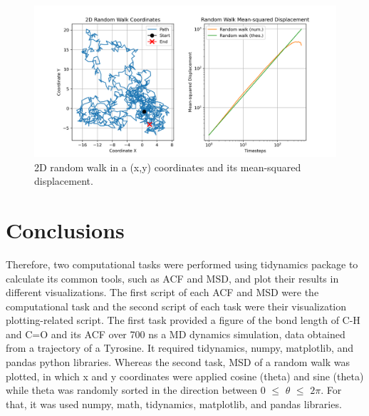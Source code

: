 \documentclass{article}
\begin{document}
\begin{figure}[H]
\centering
\includegraphics[width=\linewidth]{msd_plot.png}
\caption{2D random walk in a (x,y) coordinates and its mean-squared displacement.}
\label{fig:msd_plot}
\end{figure}

\section{Conclusions}

Therefore, two computational tasks were performed using tidynamics package to calculate its common tools, such as ACF and MSD, and plot their results in different visualizations. The first script of each ACF and MSD were the computational task and the second script of each task were their visualization plotting-related script. The first task provided a figure of the bond length of C-H and C=O and its ACF over 700 ns a MD dynamics simulation, data obtained from a trajectory of a Tyrosine. It required tidynamics, numpy, matplotlib, and pandas python libraries. Whereas the second task, MSD of a random walk was plotted, in which x and y coordinates were applied cosine (theta) and sine (theta) while theta was randomly sorted in the direction between 0 $\leq$ $\theta$ $\leq$ $2\pi$. For that, it was used numpy, math, tidynamics, matplotlib, and pandas libraries.



\end{document}
